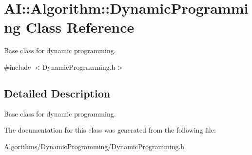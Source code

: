 \hypertarget{classAI_1_1Algorithm_1_1DynamicProgramming}{\section{A\+I\+:\+:Algorithm\+:\+:Dynamic\+Programming Class Reference}
\label{classAI_1_1Algorithm_1_1DynamicProgramming}
}


Base class for dynamic programming.  




{\ttfamily \#include $<$Dynamic\+Programming.\+h$>$}



\subsection{Detailed Description}
Base class for dynamic programming. 

The documentation for this class was generated from the following file\+:\begin{DoxyCompactItemize}
\item 
Algorithms/\+Dynamic\+Programming/Dynamic\+Programming.\+h\end{DoxyCompactItemize}

